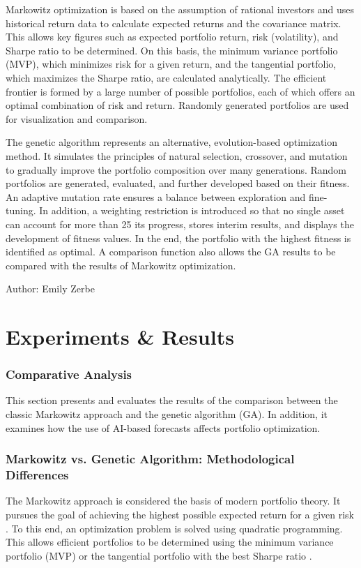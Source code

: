 \documentclass{agasthesis}
\begin{document}
Markowitz optimization is based on the assumption of rational investors and uses historical return data to calculate expected returns and the covariance matrix. 
This allows key figures such as expected portfolio return, risk (volatility), and Sharpe ratio to be determined. On this basis, the minimum variance portfolio (MVP), 
which minimizes risk for a given return, and the tangential portfolio, which maximizes the Sharpe ratio, are calculated analytically. The efficient frontier is formed by 
a large number of possible portfolios, each of which offers an optimal combination of risk and return. Randomly generated portfolios are used for visualization and comparison.

The genetic algorithm represents an alternative, evolution-based optimization method. It simulates the principles of natural selection, crossover, and mutation to gradually improve 
the portfolio composition over many generations. Random portfolios are generated, evaluated, and further developed based on their fitness. An adaptive mutation rate ensures a balance 
between exploration and fine-tuning. In addition, a weighting restriction is introduced so that no single asset can account for more than 25%
its progress, stores interim results, and displays the development of fitness values. In the end, the portfolio with the highest fitness is identified as optimal. A comparison function 
also allows the GA results to be compared with the results of Markowitz optimization.

Author: Emily Zerbe

\chapter{Experiments & Results}
\subsection{Comparative Analysis}
This section presents and evaluates the results of the comparison between the classic Markowitz approach and the genetic algorithm (GA). 
In addition, it examines how the use of AI-based forecasts affects portfolio optimization. 
\subsection{Markowitz vs. Genetic Algorithm: Methodological Differences}
The Markowitz approach is considered the basis of modern portfolio theory. It pursues the goal of achieving the highest possible expected return for a given risk \cite{mangram_simplified_2013}. 
To this end, an optimization problem is solved using quadratic programming. This allows efficient portfolios to be determined using the minimum variance portfolio (MVP) or the tangential 
portfolio with the best Sharpe ratio \cite{mangram_simplified_2013}.
\end{document}
